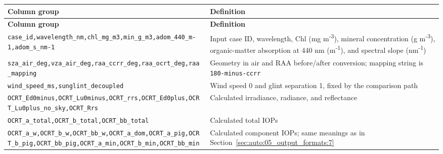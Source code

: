 {\TableFont
\begin{longtable}{@{}>{\raggedright\arraybackslash}p{}>{\raggedright\arraybackslash}p{}@{}}
\toprule
\textbf{Column group} & \textbf{Definition} \\
\midrule
\endfirsthead
\toprule
\textbf{Column group} & \textbf{Definition} \\
\midrule
\endhead
\bottomrule
\endfoot
\texttt{case\_\allowbreak{}id,\allowbreak{}wavelength\_\allowbreak{}nm,\allowbreak{}chl\_\allowbreak{}mg\_\allowbreak{}m3,\allowbreak{}min\_\allowbreak{}g\_\allowbreak{}m3,\allowbreak{}adom\_\allowbreak{}440\_\allowbreak{}m-\allowbreak{}1,\allowbreak{}adom\_\allowbreak{}s\_\allowbreak{}nm-\allowbreak{}1} & Input case ID, wavelength, Chl (mg m\textsuperscript{-}\textsuperscript{3}), mineral concentration (g m\textsuperscript{-}\textsuperscript{3}), organic-matter absorption at 440 nm (m\textsuperscript{-}\textsuperscript{1}), and spectral slope (nm\textsuperscript{-}\textsuperscript{1}) \\
\texttt{sza\_\allowbreak{}air\_\allowbreak{}deg,\allowbreak{}vza\_\allowbreak{}air\_\allowbreak{}deg,\allowbreak{}raa\_\allowbreak{}ccrr\_\allowbreak{}deg,\allowbreak{}raa\_\allowbreak{}ocrt\_\allowbreak{}deg,\allowbreak{}raa\_\allowbreak{}mapping} & Geometry in air and RAA before/after conversion; mapping string is \texttt{180-\allowbreak{}minus-\allowbreak{}ccrr} \\
\texttt{wind\_\allowbreak{}speed\_\allowbreak{}ms,\allowbreak{}sunglint\_\allowbreak{}decoupled} & Wind speed 0 and glint separation 1, fixed by the comparison path \\
\texttt{OCRT\_\allowbreak{}Ed0minus,\allowbreak{}OCRT\_\allowbreak{}Lu0minus,\allowbreak{}OCRT\_\allowbreak{}rrs,\allowbreak{}OCRT\_\allowbreak{}Ed0plus,\allowbreak{}OCRT\_\allowbreak{}Lu0plus\_\allowbreak{}no\_\allowbreak{}sky,\allowbreak{}OCRT\_\allowbreak{}Rrs} & Calculated irradiance, radiance, and reflectance \\
\texttt{OCRT\_\allowbreak{}a\_\allowbreak{}total,\allowbreak{}OCRT\_\allowbreak{}b\_\allowbreak{}total,\allowbreak{}OCRT\_\allowbreak{}bb\_\allowbreak{}total} & Calculated total IOPs \\
\texttt{OCRT\_\allowbreak{}a\_\allowbreak{}w,\allowbreak{}OCRT\_\allowbreak{}b\_\allowbreak{}w,\allowbreak{}OCRT\_\allowbreak{}bb\_\allowbreak{}w,\allowbreak{}OCRT\_\allowbreak{}a\_\allowbreak{}dom,\allowbreak{}OCRT\_\allowbreak{}a\_\allowbreak{}pig,\allowbreak{}OCRT\_\allowbreak{}b\_\allowbreak{}pig,\allowbreak{}OCRT\_\allowbreak{}bb\_\allowbreak{}pig,\allowbreak{}OCRT\_\allowbreak{}a\_\allowbreak{}min,\allowbreak{}OCRT\_\allowbreak{}b\_\allowbreak{}min,\allowbreak{}OCRT\_\allowbreak{}bb\_\allowbreak{}min} & Calculated component IOPs; same meanings as in Section~\ref{sec:auto:05_output_formats:7} \\

\end{longtable}}
